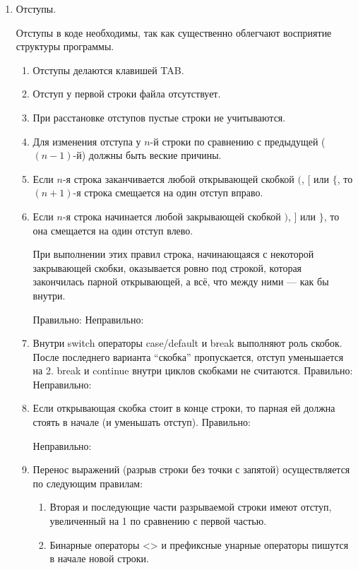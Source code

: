 \begin{enumerate}
	\item
		Отступы.

		Отступы в коде необходимы, так как существенно облегчают восприятие структуры программы.
		\begin{enumerate}
			\item
				Отступы делаются клавишей TAB.
			\item
				Отступ у первой строки файла отсутствует.
			\item
				При расстановке отступов пустые строки не учитываются.
			\item
				Для изменения отступа у $n$-й строки по сравнению с предыдущей ($(n-1)$-й) должны быть веские причины.
			\item
				Если $n$-я строка заканчивается любой открывающей скобкой $($, $[$ или $\{$,
				то $(n+1)$-я строка смещается на один отступ вправо.
			\item
				Если $n$-я строка начинается любой закрывающей скобкой $)$, $]$ или $\}$,
				то она смещается на один отступ влево.

				При выполнении этих правил строка, начинающаяся с некоторой закрывающей скобки, оказывается ровно под строкой,
				которая закончилась парной открывающей, а всё, что между ними --- как бы внутри.

				Правильно:
				Неправильно:


			\item
				Внутри switch операторы case/default и break выполняют роль скобок.
				После последнего варианта ``скобка'' пропускается, отступ уменьшается на 2.
				break и continue внутри циклов скобками не считаются.
				Правильно:
				Неправильно:


			\item
				Если открывающая скобка стоит в конце строки, то парная ей должна стоять в начале (и уменьшать отступ).
				Правильно:

				Неправильно:

			\item
				Перенос выражений (разрыв строки без точки с запятой) осуществляется по следующим правилам:
				\begin{enumerate}
					\item
						Вторая и последующие части разрываемой строки имеют отступ, увеличенный на 1 по сравнению с первой частью.
					\item
						Бинарные операторы  <\!< и >\!> и префиксные унарные операторы пишутся в начале новой строки.


\end{enumerate}
\end{enumerate}
\end{enumerate}
